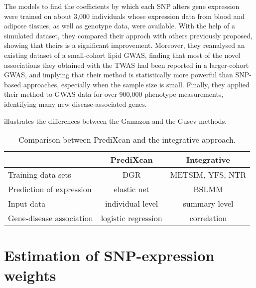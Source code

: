 \documentclass[../main.tex]{subfiles}
\begin{document}
The models to find the coefficients by which each SNP alters gene 
expression were trained on about 3,000 individuals whose expression data 
from blood and adipose tissues, as well as genotype data, were 
available. With the help of a simulated dataset, they compared their 
approch with others previously proposed, showing that theirs is a 
significant improvement. Moreover, they reanalysed an existing dataset 
of a small-cohort lipid GWAS, finding that most of the novel 
associations they obtained with the TWAS had been reported in a 
larger-cohort GWAS, and implying that their method is statistically more 
powerful than SNP-based approaches, especially when the sample size is 
small. Finally, they applied their method to GWAS data for over 900,000 
phenotype measurements, identifying many new disease-associated genes.

 illustrates the differences between the Gamazon and 
the Gusev methods.

\begin{table}
	\centering
	\begin{tabular}{ l c c }
		\toprule
		& PrediXcan & Integrative \\
		\midrule
		Training data sets & DGR & METSIM, YFS, NTR \\
		Prediction of expression & elastic net & BSLMM \\
		Input data & individual level & summary level \\
		Gene-disease association & logistic regression & correlation \\
		\bottomrule
	\end{tabular}
	\caption{Comparison between PrediXcan and the integrative approach.}
\end{table}

\section{Estimation of SNP-expression weights}
\end{document}
